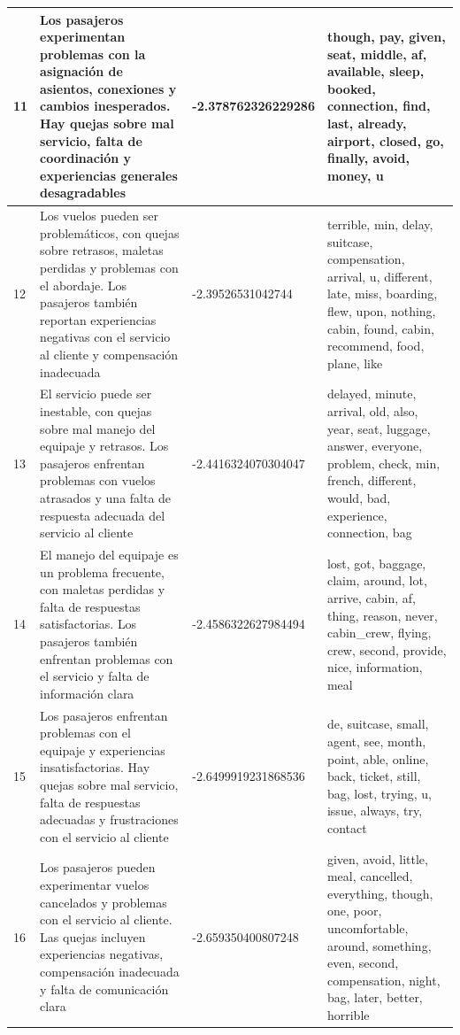 \documentclass{report}
\begin{document}
{\begin{longtable}{|p{1cm}|p{4cm}|p{4cm}|p{6cm}|}
                    \hline
                    11 & Los pasajeros experimentan problemas con la asignación de asientos, conexiones y cambios inesperados. Hay quejas sobre mal servicio, falta de coordinación y experiencias generales desagradables & -2.378762326229286 & though, pay, given, seat, middle, af, available, sleep, booked, connection, find, last, already, airport, closed, go, finally, avoid, money, u \\
                    \hline
                    12 & Los vuelos pueden ser problemáticos, con quejas sobre retrasos, maletas perdidas y problemas con el abordaje. Los pasajeros también reportan experiencias negativas con el servicio al cliente y compensación inadecuada & -2.39526531042744 & terrible, min, delay, suitcase, compensation, arrival, u, different, late, miss, boarding, flew, upon, nothing, cabin, found, cabin, recommend, food, plane, like \\
                    \hline
                    13 & El servicio puede ser inestable, con quejas sobre mal manejo del equipaje y retrasos. Los pasajeros enfrentan problemas con vuelos atrasados y una falta de respuesta adecuada del servicio al cliente & -2.4416324070304047 & delayed, minute, arrival, old, also, year, seat, luggage, answer, everyone, problem, check, min, french, different, would, bad, experience, connection, bag \\
                    \hline
                    14 & El manejo del equipaje es un problema frecuente, con maletas perdidas y falta de respuestas satisfactorias. Los pasajeros también enfrentan problemas con el servicio y falta de información clara & -2.4586322627984494 & lost, got, baggage, claim, around, lot, arrive, cabin, af, thing, reason, never, cabin\_crew, flying, crew, second, provide, nice, information, meal \\
                    \hline
                    15 & Los pasajeros enfrentan problemas con el equipaje y experiencias insatisfactorias. Hay quejas sobre mal servicio, falta de respuestas adecuadas y frustraciones con el servicio al cliente & -2.6499919231868536 & de, suitcase, small, agent, see, month, point, able, online, back, ticket, still, bag, lost, trying, u, issue, always, try, contact \\
                    \hline
                    16 & Los pasajeros pueden experimentar vuelos cancelados y problemas con el servicio al cliente. Las quejas incluyen experiencias negativas, compensación inadecuada y falta de comunicación clara & -2.659350400807248 & given, avoid, little, meal, cancelled, everything, though, one, poor, uncomfortable, around, something, even, second, compensation, night, bag, later, better, horrible \\

\end{longtable}}
\end{document}
